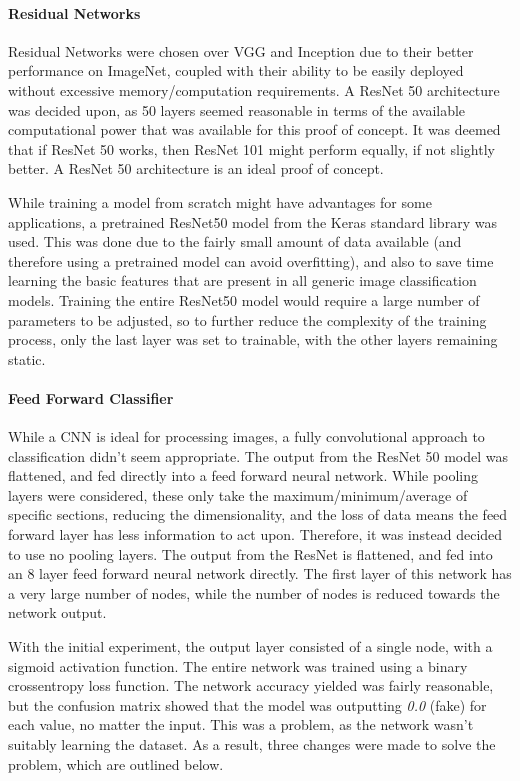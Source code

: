 \documentclass[10pt,a4paper]{article}
\begin{document}
            \paragraph{Residual Networks}
            Residual Networks were chosen over VGG and Inception due to their better performance on ImageNet, coupled with their ability to be easily deployed without excessive memory/computation requirements.
            A ResNet 50 architecture was decided upon, as 50 layers seemed reasonable in terms of the available computational power that was available for this proof of concept. It was deemed that if ResNet 50 works, then ResNet 101 might perform equally, if not
            slightly better. A ResNet 50 architecture is an ideal proof of concept.

            While training a model from scratch might have advantages for some applications, a pretrained ResNet50 model from the Keras standard library was used. This was done due to the fairly small amount of data
            available (and therefore using a pretrained model can avoid overfitting), and also to save time learning the basic features that are present in all generic image classification models. Training the entire
            ResNet50 model would require a large number of parameters to be adjusted, so to further reduce the complexity of the training process, only the last layer was set to trainable, with the other layers remaining static.


            \paragraph{Feed Forward Classifier}
            While a CNN is ideal for processing images, a fully convolutional approach to classification didn't seem appropriate. The output from the ResNet 50 model was flattened, and fed directly into a feed forward neural network.
            While pooling layers were considered, these only take the maximum/minimum/average of specific sections, reducing the dimensionality, and the loss of data means the feed forward layer has less information to act upon. Therefore,
            it was instead decided to use no pooling layers. The output from the ResNet is flattened, and fed into an 8 layer feed forward neural network directly. The first layer of this network has a very large number of nodes,
            while the number of nodes is reduced towards the network output.
            
            With the initial experiment, the output layer consisted of a single node, with a sigmoid activation function. The entire network was trained using a binary crossentropy loss function. The network accuracy yielded was fairly reasonable,
            but the confusion matrix showed that the model was outputting \emph{0.0} (fake) for each value, no matter the input. This was a problem, as the network wasn't suitably learning the dataset. As a result, three changes were made to solve the problem, which are outlined below.
            
\end{document}
